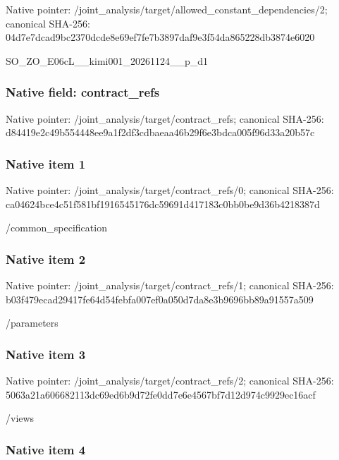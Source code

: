 \documentclass[10pt,a4paper]{article}
\begin{document}
Native pointer: /joint\_analysis/target/a\allowbreak{}llowed\_constant\_dependen\allowbreak{}cies/2; canonical SHA-256: 04d7e7dcad9bc2370dcde8e6\allowbreak{}9ef7fe7b3897daf9e3f54da8\allowbreak{}65228db3874e6020


SO\_ZO\_E06cL\_\_kimi001\_20261124\_\_p\_d1


\subsubsection{Native field: contract\_refs}


Native pointer: /joint\_analysis/target/contract\_refs; canonical SHA-256: d84419e2c49b554448ee9a1f\allowbreak{}2df3cdbaeaa46b29f6e3bdca\allowbreak{}005f96d33a20b57c



\subsubsection{Native item 1}


Native pointer: /joint\_analysis/target/contract\_refs/0; canonical SHA-256: ca04624bce4c51f581bf1916\allowbreak{}545176dc59691d417183c0bb\allowbreak{}0be9d36b4218387d


/common\_specification


\subsubsection{Native item 2}


Native pointer: /joint\_analysis/target/contract\_refs/1; canonical SHA-256: b03f479ecad29417fe64d54f\allowbreak{}ebfa007ef0a050d7da8e3b96\allowbreak{}96bb89a91557a509


/parameters


\subsubsection{Native item 3}


Native pointer: /joint\_analysis/target/contract\_refs/2; canonical SHA-256: 5063a21a606682113dc69ed6\allowbreak{}b9d72fe0dd7e6e4567bf7d12\allowbreak{}d974c9929ec16acf


/views


\subsubsection{Native item 4}
\end{document}
